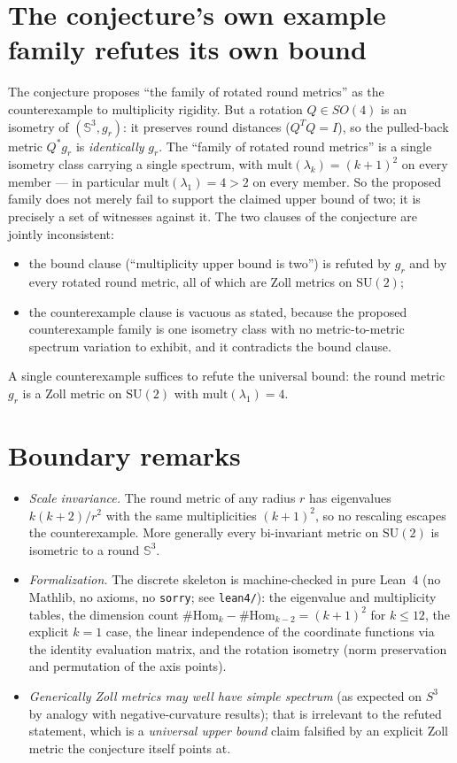 \documentclass[11pt]{article}
\newcommand{\SSp}{\mathbb{S}}
\begin{document}
\section{The conjecture's own example family refutes its own bound}

The conjecture proposes ``the family of rotated round metrics'' as the
counterexample to multiplicity rigidity. But a rotation
$Q \in SO(4)$ is an isometry of $(\SSp^3, g_r)$: it preserves round distances
($Q^T Q = I$), so the pulled-back metric $Q^* g_r$ is \emph{identically}
$g_r$. The ``family of rotated round metrics'' is a single isometry class
carrying a single spectrum, with $\mathrm{mult}(\lambda_k) = (k+1)^2$ on
every member --- in particular $\mathrm{mult}(\lambda_1) = 4 > 2$ on every
member. So the proposed family does not merely fail to support the claimed
upper bound of two; it is precisely a set of witnesses against it. The two
clauses of the conjecture are jointly inconsistent:

\begin{itemize}
\item the bound clause (``multiplicity upper bound is two'') is refuted by
$g_r$ and by every rotated round metric, all of which are Zoll metrics on
$\mathrm{SU}(2)$;
\item the counterexample clause is vacuous as stated, because the proposed
counterexample family is one isometry class with no metric-to-metric
spectrum variation to exhibit, and it contradicts the bound clause.
\end{itemize}

A single counterexample suffices to refute the universal bound: the round
metric $g_r$ is a Zoll metric on $\mathrm{SU}(2)$ with
$\mathrm{mult}(\lambda_1) = 4$.

\section{Boundary remarks}

\begin{itemize}
\item \emph{Scale invariance.} The round metric of any radius $r$ has
eigenvalues $k(k+2)/r^2$ with the same multiplicities $(k+1)^2$, so no
rescaling escapes the counterexample. More generally every bi-invariant
metric on $\mathrm{SU}(2)$ is isometric to a round $\SSp^3$.
\item \emph{Formalization.} The discrete skeleton is machine-checked in pure
Lean~4 (no Mathlib, no axioms, no \texttt{sorry}; see \texttt{lean4/}): the
eigenvalue and multiplicity tables, the dimension count
$\#\mathrm{Hom}_k - \#\mathrm{Hom}_{k-2} = (k+1)^2$ for $k \le 12$, the
explicit $k = 1$ case, the linear independence of the coordinate functions
via the identity evaluation matrix, and the rotation isometry
(norm preservation and permutation of the axis points).
\item \emph{Generically Zoll metrics may well have simple spectrum} (as
expected on $S^3$ by analogy with negative-curvature results); that is
irrelevant to the refuted statement, which is a \emph{universal upper bound}
claim falsified by an explicit Zoll metric the conjecture itself points at.
\end{itemize}
\end{document}

